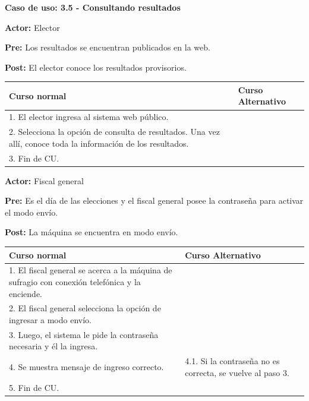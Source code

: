 \textbf{Caso de uso: 3.5 - Consultando resultados} 

\textbf{Actor:} Elector

\textbf{Pre:} Los resultados se encuentran publicados en la web.

\textbf{Post:} El elector conoce los resultados provisorios.

\begin{table}[h!]
	
 \begin{tabular}{|p{7.5cm} | p{7.5cm}|} 
 \hline
 \textbf{Curso normal} & \textbf{Curso Alternativo} \\
 \hline
 
1. El elector ingresa al sistema web público. & \\
\hline


2. Selecciona la opción de consulta de resultados. Una vez allí, conoce toda la información de los resultados. & \\
\hline


3. Fin de CU. & \\
\hline
\end{tabular}
\end{table}




\textbf{Actor:} Fiscal general

\textbf{Pre:} Es el día de las elecciones y el fiscal general posee la contraseña para activar el modo envío.

\textbf{Post:} La máquina se encuentra en modo envío.

\begin{table}[h!]
	
 \begin{tabular}{|p{7.5cm} | p{7.5cm}|} 
 \hline
 \textbf{Curso normal} & \textbf{Curso Alternativo} \\
 \hline

1. El fiscal general se acerca a la máquina de sufragio con conexión telefónica y la enciende. & \\
\hline

2. El fiscal general selecciona la opción de ingresar a modo envío. & \\
\hline

3. Luego, el sistema le pide la contraseña necesaria y él la ingresa. & \\
\hline

4. Se muestra mensaje de ingreso correcto. &
4.1. Si la contraseña no es correcta, se vuelve al paso 3. \\
\hline
5. Fin de CU. \\

\end{tabular}
\end{table}


